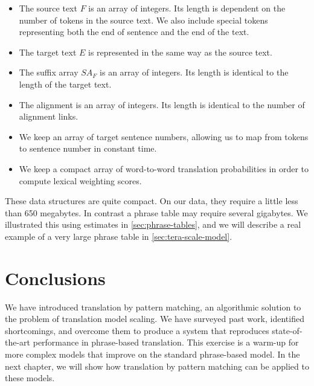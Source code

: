 \begin{itemize}
	\item The source text $F$ is an array of integers.  Its length is
	dependent on the number of tokens in the source text.  We also
	include special tokens representing both the end of sentence and
	the end of the text.
	\item The target text $E$ is represented in the same way as the source
	text.
	\item The suffix array $SA_F$ is an array of integers.  Its length
	is identical to the length of the target text.
	\item The alignment is an array of integers.  Its length is identical
	to the number of alignment links.
	\item We keep an array of target sentence numbers, allowing us to 
	map from tokens to sentence number in constant time.
	\item We keep a compact array of word-to-word translation probabilities
	in order to compute lexical weighting scores.
\end{itemize}

These data structures are quite compact.  On our data, they require
a little less than 650 megabytes.  In contrast a phrase table may require 
several gigabytes.  We illustrated this using estimates in 
\textsection\ref{sec:phrase-tables}, and we will describe a real
example of a very large phrase table in \textsection\ref{sec:tera-scale-model}.

\section{Conclusions}\label{sec:overview-conclusions}

We have introduced translation by pattern matching, an algorithmic
solution to the problem of translation model scaling.  We have surveyed
past work, identified shortcomings, and overcome them to produce a system
that reproduces state-of-the-art performance in phrase-based translation.
This exercise is a warm-up for more complex models that improve on the standard
phrase-based model.  In the next chapter, we will show how translation
by pattern matching can be applied to these models.





